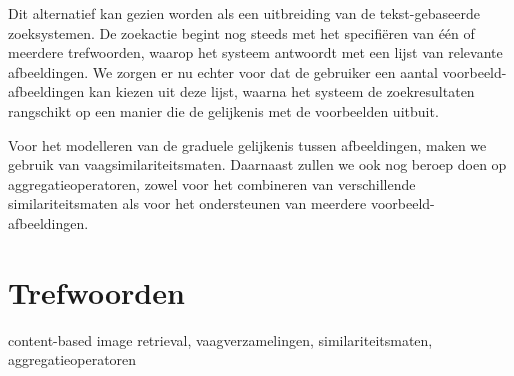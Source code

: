 Dit alternatief kan gezien worden als een uitbreiding van de tekst-gebaseerde zoeksystemen.
De zoekactie begint nog steeds met het specifi\"eren van \'e\'en of meerdere trefwoorden, waarop
het systeem antwoordt met een lijst van relevante afbeeldingen. We zorgen er nu echter voor
dat de gebruiker een aantal voorbeeld-afbeeldingen kan kiezen uit deze lijst, waarna het
systeem de zoekresultaten rangschikt op een manier die de gelijkenis met de voorbeelden uitbuit.

Voor het modelleren van de graduele gelijkenis tussen afbeeldingen, maken we gebruik van 
vaagsimilariteitsmaten. Daarnaast zullen we ook nog beroep doen op aggregatieoperatoren,
zowel voor het combineren van verschillende similariteitsmaten als voor het ondersteunen van
meerdere voorbeeld-afbeeldingen. 

\section*{Trefwoorden}
content-based image retrieval, vaagverzamelingen, similariteitsmaten, aggregatieoperatoren

